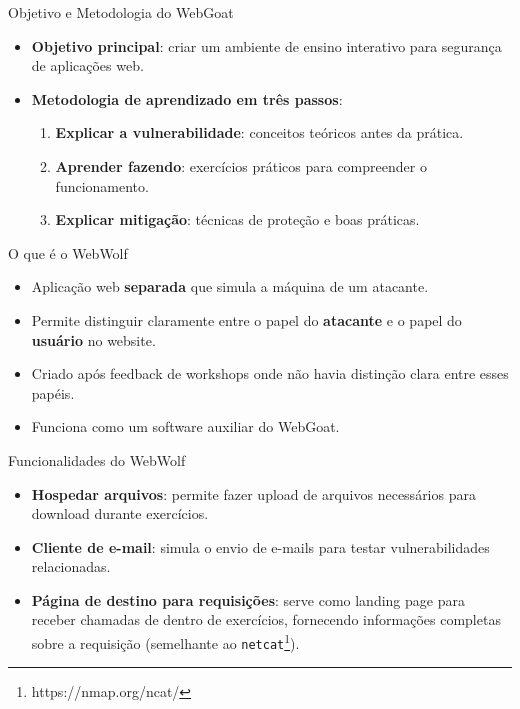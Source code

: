 \documentclass[aspectratio=169]{beamer}
\begin{document}
\begin{frame}{Objetivo e Metodologia do WebGoat}
   \begin{itemize}
        \item \textbf{Objetivo principal}: criar um ambiente de ensino interativo para segurança de aplicações web.
        \item \textbf{Metodologia de aprendizado em três passos}:
        \begin{enumerate}
            \item \textbf{Explicar a vulnerabilidade}: conceitos teóricos antes da prática.
            \item \textbf{Aprender fazendo}: exercícios práticos para compreender o funcionamento.
            \item \textbf{Explicar mitigação}: técnicas de proteção e boas práticas.
        \end{enumerate}
    \end{itemize}
\end{frame}

\begin{frame}{O que é o WebWolf}
    \begin{itemize}
        \item Aplicação web \textbf{separada} que simula a máquina de um atacante.
        \item Permite distinguir claramente entre o papel do \textbf{atacante} e o papel do \textbf{usuário} no website.
        \item Criado após feedback de workshops onde não havia distinção clara entre esses papéis.
        \item Funciona como um software auxiliar do WebGoat.
    \end{itemize}
\end{frame}

\begin{frame}{Funcionalidades do WebWolf}
    \begin{itemize}
        \item \textbf{Hospedar arquivos}: permite fazer upload de arquivos necessários para download durante exercícios.
        \item \textbf{Cliente de e-mail}: simula o envio de e-mails para testar vulnerabilidades relacionadas.
        \item \textbf{Página de destino para requisições}: serve como landing page para receber chamadas de dentro de exercícios, fornecendo informações completas sobre a requisição (semelhante ao \texttt{netcat}\footnote{https://nmap.org/ncat/}).
    \end{itemize}
\end{frame}
\end{document}
